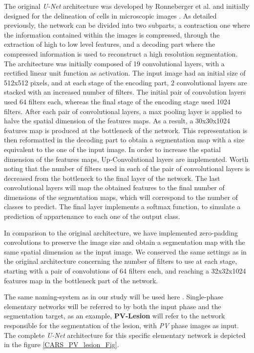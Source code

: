 \documentclass[]{article}
\newcommand{\pplfont}[1]{{\textbf{\fontfamily{ppl}\selectfont #1}}}
\begin{document}
	The original \emph{U-Net} architecture was developed by Ronneberger et
	al. and initially designed for the
	delineation of cells in microscopic images \cite{Ronneberger2015}. As detailed previously, the
	network can be divided into two subparts, a contraction one where the
	information contained within the images is compressed, through the
	extraction of high to low level features, and a decoding part where the
	compressed information is used to reconstruct a high resolution
	segmentation. The architecture was initially composed of 19
	convolutional layers, with a rectified linear unit function as
	activation. The input image had an initial size of 512x512 pixels, and
	at each stage of the encoding part, 2 convolutional layers are stacked
	with an increased number of filters. The initial pair of convolution
	layers used 64 filters each, whereas the final stage of the encoding
	stage used 1024 filters. After each pair of convolutional layers, a max
	pooling layer is applied to halve the spatial dimension of the features
	maps. As a result, a 30x30x1024 features map is produced at the
	bottleneck of the network. This representation is then reformatted in
	the decoding part to obtain a segmentation map with a size equivalent to
	the one of the input image. In order to increase the spatial dimension
	of the features maps, Up-Convolutional layers are implemented. Worth
	noting that the number of filters used in each of the pair of
	convolutional layers is decreased from the bottleneck to the final layer
	of the network. The last convolutional layers will map the obtained
	features to the final number of dimensions of the segmentation maps,
	which will correspond to the number of classes to predict. The final
	layer implements a softmax function, to simulate a prediction of
	appartenance to each one of the output class.
	
	In comparison to the original architecture, we have implemented
	zero-padding convolutions to preserve the image size and obtain a
	segmentation map with the same spatial dimension as the input image. We
	conserved the same settings as in the original architecture concerning
	the number of filters to use at each stage, starting with a pair of
	convolutions of 64 filters each, and reaching a 32x32x1024 features map
	in the bottleneck part of the network.
	
	The same naming-system as in our study will be used
	here \cite{Ouhmich2019}. Single-phase elementary networks will be referred to by both the
	input phase and the segmentation target, as an example, \pplfont{PV-Lesion} will
	refer to the network responsible for the segmentation of the lesion,
	with \emph{PV} phase images as input. The complete \emph{U-Net}
	architecture for this specific elementary network is depicted in the figure \ref{CARS_PV_lesion_Fig}.
	
\end{document}
